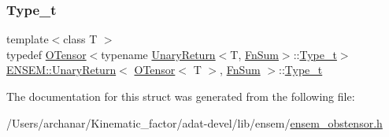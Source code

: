 \mbox{\label{structENSEM_1_1UnaryReturn_3_01OTensor_3_01T_01_4_00_01FnSum_01_4_a97a77020ae2f9a17419c0a6b9c45b5b9}} 
\subsubsection{\texorpdfstring{Type\_t}{Type\_t}\hspace{0.1cm}{\footnotesize\ttfamily [3/3]}}
{\footnotesize\ttfamily template$<$class T $>$ \\
typedef \mbox{\hyperlink{classENSEM_1_1OTensor}{O\+Tensor}}$<$typename \mbox{\hyperlink{structENSEM_1_1UnaryReturn}{Unary\+Return}}$<$T, \mbox{\hyperlink{structENSEM_1_1FnSum}{Fn\+Sum}}$>$\+::\mbox{\hyperlink{structENSEM_1_1UnaryReturn_3_01OTensor_3_01T_01_4_00_01FnSum_01_4_a97a77020ae2f9a17419c0a6b9c45b5b9}{Type\+\_\+t}}$>$ \mbox{\hyperlink{structENSEM_1_1UnaryReturn}{E\+N\+S\+E\+M\+::\+Unary\+Return}}$<$ \mbox{\hyperlink{classENSEM_1_1OTensor}{O\+Tensor}}$<$ T $>$, \mbox{\hyperlink{structENSEM_1_1FnSum}{Fn\+Sum}} $>$\+::\mbox{\hyperlink{structENSEM_1_1UnaryReturn_3_01OTensor_3_01T_01_4_00_01FnSum_01_4_a97a77020ae2f9a17419c0a6b9c45b5b9}{Type\+\_\+t}}}



The documentation for this struct was generated from the following file\+:\begin{DoxyCompactItemize}
\item 
/\+Users/archanar/\+Kinematic\+\_\+factor/adat-\/devel/lib/ensem/\mbox{\hyperlink{adat-devel_2lib_2ensem_2ensem__obstensor_8h}{ensem\+\_\+obstensor.\+h}}\end{DoxyCompactItemize}
